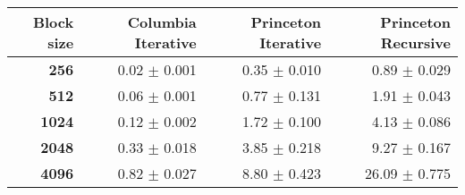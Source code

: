 \begin{tabular}{rrrr}\toprule
\textbf{Block size}  & \textbf{Columbia Iterative} & \textbf{Princeton Iterative} & \textbf{Princeton Recursive}\\\midrule
\textbf{256}  & 0.02 $\pm$ 0.001 & 0.35 $\pm$ 0.010 & 0.89 $\pm$ 0.029\\
\textbf{512}  & 0.06 $\pm$ 0.001 & 0.77 $\pm$ 0.131 & 1.91 $\pm$ 0.043\\
\textbf{1024}  & 0.12 $\pm$ 0.002 & 1.72 $\pm$ 0.100 & 4.13 $\pm$ 0.086\\
\textbf{2048}  & 0.33 $\pm$ 0.018 & 3.85 $\pm$ 0.218 & 9.27 $\pm$ 0.167\\
\textbf{4096} & 0.82 $\pm$ 0.027 & 8.80 $\pm$ 0.423 & 26.09 $\pm$ 0.775\\
\bottomrule
\end{tabular}

